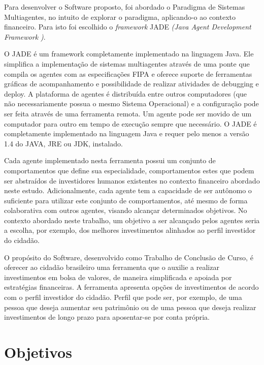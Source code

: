 Para desenvolver o Software proposto, foi abordado o Paradigma de Sistemas Multiagentes, no intuito de explorar o paradigma, aplicando-o ao contexto financeiro. Para isto foi escolhido o \textit{framework} JADE  \textit{(Java Agent Development Framework )}.

\begin{citacao}
O JADE é um framework completamente implementado na linguagem Java. Ele simplifica a implementação de sistemas multiagentes através de uma ponte que compila os agentes com as especificações FIPA e oferece suporte de ferramentas gráficas de acompanhamento e possibilidade de realizar atividades de debugging e deploy.  A plataforma de agentes é distribuída entre outros computadores (que não necessariamente possua o mesmo Sistema Operacional) e a configuração pode ser feita através de uma ferramenta remota. Um agente pode ser movido de um computador para outro em tempo de execução sempre que necessário. O JADE é completamente implementado na linguagem Java e requer pelo menos a versão 1.4 do JAVA, JRE ou  JDK, instalado. \cite{telecon2014}
\end{citacao}

Cada agente implementado nesta ferramenta possui um conjunto de comportamentos que define sua especialidade, comportamentos estes que podem ser abstraídos de investidores humanos existentes no contexto financeiro abordado neste estudo. Adicionalmente, cada agente tem a capacidade de ser autônomo o suficiente para utilizar este conjunto de comportamentos, até mesmo de forma colaborativa com outros agentes, visando alcançar determinados objetivos. No contexto abordado neste trabalho, um objetivo a ser alcançado pelos agentes seria a escolha, por exemplo, dos melhores investimentos alinhados ao perfil investidor do cidadão.

O propósito do Software, desenvolvido como Trabalho de Conclusão de Curso, é oferecer ao cidadão brasileiro uma ferramenta que o auxilie a realizar investimentos em bolsa de valores, de maneira simplificada e apoiada por estratégias financeiras. A ferramenta apresenta opções de investimentos de acordo com o perfil investidor do cidadão. Perfil que pode ser, por exemplo, de uma pessoa que deseja aumentar seu patrimônio ou de uma pessoa que deseja realizar investimentos de longo prazo para aposentar-se por conta própria.

\section{Objetivos}

